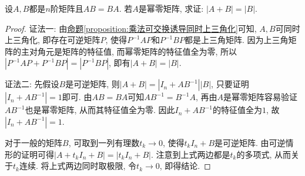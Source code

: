 \documentclass[../../main.tex]{subfiles}
\begin{document}
\begin{example}
设\(A,B\)都是\(n\)阶矩阵且\(AB = BA\). 若\(A\)是幂零矩阵, 求证: \(|A + B| = |B|\).
\end{example}
\begin{proof}
{\color{blue}证法一:} 由\hyperref[proposition:乘法可交换诱导同时上三角化]{命题\ref{proposition:乘法可交换诱导同时上三角化}}可知, \(A,B\)可同时上三角化, 即存在可逆矩阵\(P\), 使得\(P^{-1}AP\)和\(P^{-1}BP\)都是上三角矩阵. 因为上三角矩阵的主对角元是矩阵的特征值, 而幂零矩阵的特征值全为零, 所以\(|P^{-1}AP + P^{-1}BP| = |P^{-1}BP|\), 即有\(|A + B| = |B|\).
    
{\color{blue}证法二:} 先假设\(B\)是可逆矩阵, 则\(|A + B| = |I_{n}+AB^{-1}||B|\), 只要证明\(|I_{n}+AB^{-1}| = 1\)即可. 由\(AB = BA\)可知\(AB^{-1}=B^{-1}A\), 再由\(A\)是幂零矩阵容易验证\(AB^{-1}\)也是幂零矩阵, 从而其特征值全为零. 因此\(I_{n}+AB^{-1}\)的特征值全为\(1\), 故\(|I_{n}+AB^{-1}| = 1\). 
    
对于一般的矩阵\(B\), 可取到一列有理数\(t_{k}\to 0\), 使得\(t_{k}I_{n}+B\)是可逆矩阵. 由可逆情形的证明可得\(|A + t_{k}I_{n}+B| = |t_{k}I_{n}+B|\). 注意到上式两边都是\(t_{k}\)的多项式, 从而关于\(t_{k}\)连续. 将上式两边同时取极限, 令\(t_{k}\to 0\), 即得结论.
\end{proof}
\end{document}
